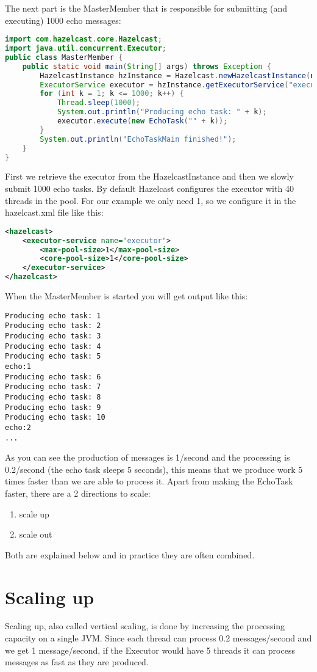 The next part is the MasterMember that is responsible for submitting (and executing) 1000 echo messages:
\begin{lstlisting}[language=java]
import com.hazelcast.core.Hazelcast;
import java.util.concurrent.Executor;
public class MasterMember {
    public static void main(String[] args) throws Exception {
        HazelcastInstance hzInstance = Hazelcast.newHazelcastInstance(null);
        ExecutorService executor = hzInstance.getExecutorService("executor");
        for (int k = 1; k <= 1000; k++) {
            Thread.sleep(1000);
            System.out.println("Producing echo task: " + k);
            executor.execute(new EchoTask("" + k));
        }
        System.out.println("EchoTaskMain finished!");
    }
}
\end{lstlisting}
First we retrieve the executor from the HazelcastInstance and then we slowly submit 1000 echo tasks. By default Hazelcast configures the executor with 40 threads in the pool. For our example we only need 1, so we configure it in the hazelcast.xml file like this:
\begin{lstlisting}[language=xml]
<hazelcast>
    <executor-service name="executor">
        <max-pool-size>1</max-pool-size>
        <core-pool-size>1</core-pool-size>
    </executor-service>
</hazelcast>
\end{lstlisting}
When the MasterMember is started you will get output like this:
\begin{lstlisting}
Producing echo task: 1
Producing echo task: 2
Producing echo task: 3
Producing echo task: 4
Producing echo task: 5
echo:1
Producing echo task: 6
Producing echo task: 7
Producing echo task: 8
Producing echo task: 9
Producing echo task: 10
echo:2
...
\end{lstlisting}
As you can see the production of messages is 1/second and the processing is 0.2/second (the echo task sleeps 5 seconds), this means that we produce work 5 times faster than we are able to process it. Apart from making the EchoTask faster, there are a 2 directions to scale:
\begin{enumerate}
\item scale up 
\item scale out
\end{enumerate}
Both are explained below and in practice they are often combined. 

\section{Scaling up}
Scaling up, also called vertical scaling, is done by increasing the processing capacity on a single JVM. Since each thread can process 0.2 messages/second and we get 1 message/second, if the Executor would have 5 threads it can process messages as fast as they are produced.


